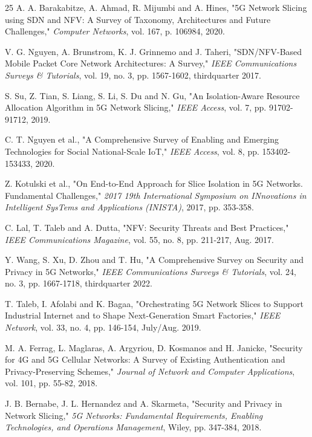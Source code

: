 \documentclass[12pt]{article}
\begin{document}
\begin{thebibliography}{25}
A. A. Barakabitze, A. Ahmad, R. Mijumbi and A. Hines, 
"5G Network Slicing using SDN and NFV: A Survey of Taxonomy, Architectures and Future Challenges," 
\textit{Computer Networks}, vol. 167, p. 106984, 2020.

V. G. Nguyen, A. Brunstrom, K. J. Grinnemo and J. Taheri, 
"SDN/NFV-Based Mobile Packet Core Network Architectures: A Survey," 
\textit{IEEE Communications Surveys \& Tutorials}, vol. 19, no. 3, pp. 1567-1602, thirdquarter 2017.

S. Su, Z. Tian, S. Liang, S. Li, S. Du and N. Gu, 
"An Isolation-Aware Resource Allocation Algorithm in 5G Network Slicing," 
\textit{IEEE Access}, vol. 7, pp. 91702-91712, 2019.

C. T. Nguyen et al., 
"A Comprehensive Survey of Enabling and Emerging Technologies for Social National-Scale IoT," 
\textit{IEEE Access}, vol. 8, pp. 153402-153433, 2020.

Z. Kotulski et al., 
"On End-to-End Approach for Slice Isolation in 5G Networks. Fundamental Challenges," 
\textit{2017 19th International Symposium on INnovations in Intelligent SysTems and Applications (INISTA)}, 2017, pp. 353-358.

C. Lal, T. Taleb and A. Dutta, 
"NFV: Security Threats and Best Practices," 
\textit{IEEE Communications Magazine}, vol. 55, no. 8, pp. 211-217, Aug. 2017.

Y. Wang, S. Xu, D. Zhou and T. Hu, 
"A Comprehensive Survey on Security and Privacy in 5G Networks," 
\textit{IEEE Communications Surveys \& Tutorials}, vol. 24, no. 3, pp. 1667-1718, thirdquarter 2022.

T. Taleb, I. Afolabi and K. Bagaa, 
"Orchestrating 5G Network Slices to Support Industrial Internet and to Shape Next-Generation Smart Factories," 
\textit{IEEE Network}, vol. 33, no. 4, pp. 146-154, July/Aug. 2019.

M. A. Ferrag, L. Maglaras, A. Argyriou, D. Kosmanos and H. Janicke, 
"Security for 4G and 5G Cellular Networks: A Survey of Existing Authentication and Privacy-Preserving Schemes," 
\textit{Journal of Network and Computer Applications}, vol. 101, pp. 55-82, 2018.

J. B. Bernabe, J. L. Hernandez and A. Skarmeta, 
"Security and Privacy in Network Slicing," 
\textit{5G Networks: Fundamental Requirements, Enabling Technologies, and Operations Management}, Wiley, pp. 347-384, 2018.


\end{thebibliography}
\end{document}
